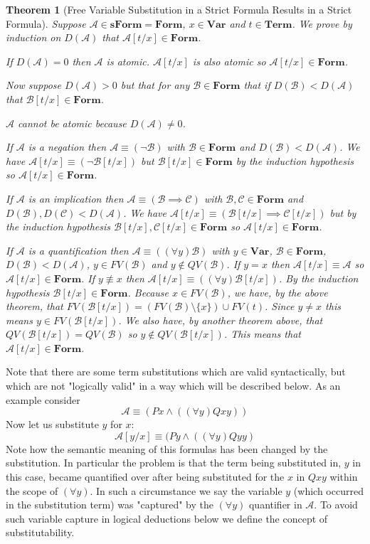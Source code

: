 \documentclass[12pt]{article}
\theoremstyle{break}
\theoremstyle{break}
\newtheorem{theorem}{Theorem}[section]
\theoremstyle{break}
\theoremstyle{break}
\theoremstyle{break}
\newtheorem{informal definition}[definition]{Informal Definition}
\newcommand{\mc}[1]{\mathcal{#1}}
\begin{document}
\begin{theorem}[Free Variable Substitution in a Strict Formula Results in a Strict Formula]
Suppose $\mc{A}\in\textbf{sForm} = \textbf{Form}$, $x\in\textbf{Var}$ and $t\in\textbf{Term}$. We prove by induction on $D(\mc{A})$ that $\mc{A}[t/x]\in\textbf{Form}$.

If $D(\mc{A}) = 0$ then $\mc{A}$ is atomic. $\mc{A}[t/x]$ is also atomic so $\mc{A}[t/x]\in\textbf{Form}$.

Now suppose $D(\mc{A})>0$ but that for any $\mc{B}\in\textbf{Form}$ that if $D(\mc{B}) < D(\mc{A})$ that $\mc{B}[t/x]\in\textbf{Form}$.

$\mc{A}$ cannot be atomic because $D(\mc{A})\neq 0$.

If $\mc{A}$ is a negation then $\mc{A} \equiv (\lnot \mc{B})$ with $\mc{B}\in\textbf{Form}$ and $D(\mc{B})<D(\mc{A})$. We have $\mc{A}[t/x] \equiv (\lnot \mc{B}[t/x])$ but $\mc{B}[t/x]\in\textbf{Form}$ by the induction hypothesis so $\mc{A}[t/x]\in\textbf{Form}$.

If $\mc{A}$ is an implication then $\mc{A}\equiv (\mc{B}\implies \mc{C})$ with $\mc{B}, \mc{C}\in\textbf{Form}$ and $D(\mc{B}), D(\mc{C}) < D(\mc{A})$. We have $\mc{A}[t/x] \equiv (\mc{B}[t/x] \implies \mc{C}[t/x])$ but by the induction hypothesis $\mc{B}[t/x], \mc{C}[t/x]\in\textbf{Form}$ so $\mc{A}[t/x]\in\textbf{Form}$.

If $\mc{A}$ is a quantification then $\mc{A} \equiv ((\forall y) \mc{B})$ with $y\in\textbf{Var}$, $\mc{B}\in \textbf{Form}$, $D(\mc{B})<D(\mc{A})$, $y\in FV(\mc{B})$ and $y\not \in QV(\mc{B})$. If $y= x$ then $\mc{A}[t/x] \equiv \mc{A}$ so $\mc{A}[t/x]\in\textbf{Form}$. If $y\not \equiv x$ then $\mc{A}[t/x] \equiv ((\forall y) \mc{B}[t/x])$. By the induction hypothesis $\mc{B}[t/x]\in\textbf{Form}$. Because $x\in FV(\mc{B})$, we have, by the above theorem, that $FV(\mc{B}[t/x]) = (FV(\mc{B})\setminus\{x\})\cup FV(t)$. Since $y \neq x$ this means $y \in FV(\mc{B}[t/x])$. We also have, by another theorem above, that $QV(\mc{B}[t/x]) = QV(\mc{B})$ so $y\not \in QV(\mc{B}[t/x])$. This means that $\mc{A}[t/x]\in\textbf{Form}$.

\end{theorem}

Note that there are some term substitutions which are valid syntactically, but which are not "logically valid" in a way which will be described below.
As an example consider
$$
\mc{A} \equiv (Px \land ((\forall y) Qxy))
$$
Now let us substitute $y$ for $x$:
$$
\mc{A}[y/x] \equiv (Py \land ((\forall y) Qyy)
$$
Note how the semantic meaning of this formulas has been changed by the substitution.
In particular the problem is that the term being substituted in, $y$ in this case, became quantified over after being substituted for the $x$ in $Qxy$ within the scope of $(\forall y)$.
In such a circumstance we say the variable $y$ (which occurred in the substitution term) was "captured" by the $(\forall y)$ quantifier in $\mc{A}$.
To avoid such variable capture in logical deductions below we define the concept of substitutability.
\end{document}
